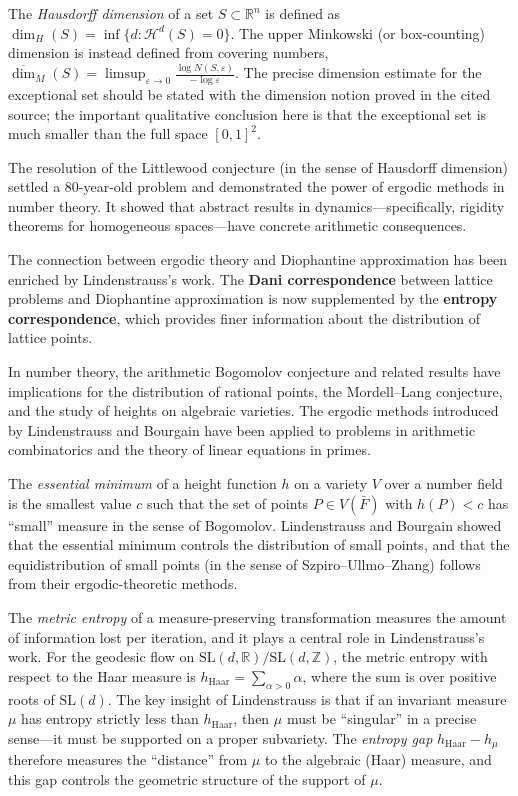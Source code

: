 The \emph{Hausdorff dimension} of a set $S \subset \mathbb{R}^n$ is defined as $\dim_H(S) = \inf\{d : \mathcal{H}^d(S) = 0\}$. The upper Minkowski (or box-counting) dimension is instead defined from covering numbers, $\overline{\dim}_M(S)=\limsup_{\varepsilon\to0}\frac{\log N(S,\varepsilon)}{-\log\varepsilon}$. The precise dimension estimate for the exceptional set should be stated with the dimension notion proved in the cited source; the important qualitative conclusion here is that the exceptional set is much smaller than the full space $[0,1]^2$.

The resolution of the Littlewood conjecture (in the sense of Hausdorff dimension) settled a 80-year-old problem and demonstrated the power of ergodic methods in number theory. It showed that abstract results in dynamics---specifically, rigidity theorems for homogeneous spaces---have concrete arithmetic consequences.

The connection between ergodic theory and Diophantine approximation has been enriched by Lindenstrauss's work. The \textbf{Dani correspondence} between lattice problems and Diophantine approximation is now supplemented by the \textbf{entropy correspondence}, which provides finer information about the distribution of lattice points.

In number theory, the arithmetic Bogomolov conjecture and related results have implications for the distribution of rational points, the Mordell--Lang conjecture, and the study of heights on algebraic varieties. The ergodic methods introduced by Lindenstrauss and Bourgain have been applied to problems in arithmetic combinatorics and the theory of linear equations in primes.

The \emph{essential minimum} of a height function $h$ on a variety $V$ over a number field is the smallest value $c$ such that the set of points $P \in V(\bar{F})$ with $h(P) < c$ has ``small'' measure in the sense of Bogomolov. Lindenstrauss and Bourgain showed that the essential minimum controls the distribution of small points, and that the equidistribution of small points (in the sense of Szpiro--Ullmo--Zhang) follows from their ergodic-theoretic methods.

The \emph{metric entropy} of a measure-preserving transformation measures the amount of information lost per iteration, and it plays a central role in Lindenstrauss's work. For the geodesic flow on $\text{SL}(d,\mathbb{R})/\text{SL}(d,\mathbb{Z})$, the metric entropy with respect to the Haar measure is $h_{\text{Haar}} = \sum_{\alpha > 0} \alpha$, where the sum is over positive roots of $\text{SL}(d)$. The key insight of Lindenstrauss is that if an invariant measure $\mu$ has entropy strictly less than $h_{\text{Haar}}$, then $\mu$ must be ``singular'' in a precise sense---it must be supported on a proper subvariety. The \emph{entropy gap} $h_{\text{Haar}} - h_\mu$ therefore measures the ``distance'' from $\mu$ to the algebraic (Haar) measure, and this gap controls the geometric structure of the support of $\mu$.

